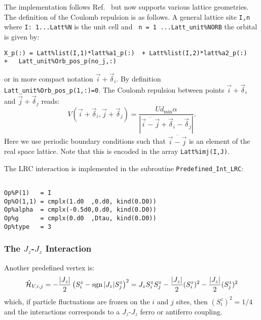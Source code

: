 The implementation follows Ref.~\cite{Hohenadler14}  but now supports various lattice geometries.    The definition of  the Coulomb repulsion is as follows. 
A general lattice site  \texttt{I,n}   where \texttt{I: 1...Latt\%N} is the unit cell and \texttt{ n = 1 ...Latt\_unit\%NORB}  the orbital  is given by: 
\begin{lstlisting}[style=fortran]
X_p(:) = Latt%list(I,1)*latt%a1_p(:)  + Latt%list(I,2)*latt%a2_p(:) 
+   Latt_unit%Orb_pos_p(no_j,:)
\end{lstlisting}
or in more compact notation $ \vec{i}  + \vec{\delta}_i $.   By definition \texttt{Latt\_unit\%Orb\_pos\_p(1,:)=0}.
The Coulomb repulsion between points   $ \vec{i}  + \vec{\delta}_i $   and $ \vec{j}  + \vec{\delta}_j $   reads: 
\begin{equation}
V(\vec{i}  + \vec{\delta}_i ,  \vec{j}  + \vec{\delta}_j  )  =  \frac{U d_\mathrm{min} \alpha}{  |  \overline{\vec{i} - \vec{j}} + \vec{\delta}_i - \vec{\delta}_j  |}.
\end{equation}
Here  we use periodic boundary conditions such that  $\overline{\vec{i} - \vec{j}}$  is an element of the real space lattice. Note that this is encoded in the array \texttt{Latt\%imj(I,J)}.

The LRC interaction is implemented in the subroutine \texttt{Predefined\_Int\_LRC}:
\begin{lstlisting}[style=fortran]

Op%P(1)   = I
Op%O(1,1) = cmplx(1.d0  ,0.d0, kind(0.D0))
Op%alpha  = cmplx(-0.5d0,0.d0, kind(0.D0))
Op%g      = cmplx(0.d0  ,Dtau, kind(0.D0)) 
Op%type   = 3

\end{lstlisting}


\subsubsection{The $J_z$-$J_z$ Interaction}

Another predefined vertex is:
\begin{align}
\hat{\mathcal{H}}_{V,i,j} =
- \frac{|J_z|}{2}  \left( S^{z}_i - \operatorname{sgn}|J_z| S^{z}_j \right)^2 =
J_z  S^{z}_i  S^{z}_j  - \frac{|J_z|}{2} (S^{z}_i)^2 - \frac{|J_z|}{2}(S^{z}_j)^2 
\end{align} 
which, if particle fluctuations are frozen on the $i$ and $j$ sites, then $(S^{z}_i)^2 = 1/4$ and the interactions corresponds to a $J_z$-$J_z$ ferro or antiferro coupling.

